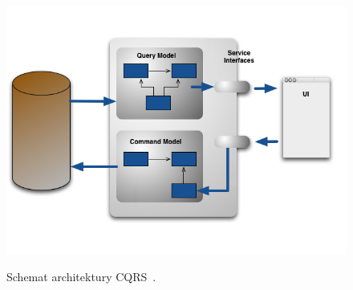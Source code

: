 \begin{figure}[!ht]
 \begin{center}
  \scalebox{0.5}
  {
   \includegraphics{figures/generated_app_type/cqrs.png}
  }
 \end{center}
 \caption{Schemat architektury CQRS~\cite{cqrs}.}
 \label{fig:cqrs}
\end{figure}
